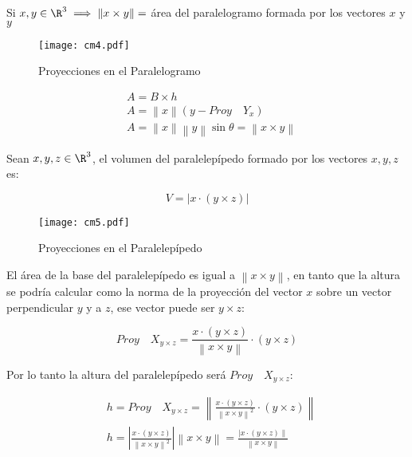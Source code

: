 Si $x,y\in \R^3\implies \left\lVert x\times y\right\rVert=$ área del paralelogramo formada por los vectores $x$ y $y$


\begin{figure}[h!]
	\centering
	\texttt{[image: cm4.pdf]}
	\caption{Proyecciones en el Paralelogramo}
\end{figure}

\begin{align*}
	 & A=B\times h                                                                                        \\
	 & A=\left\lVert x\right\rVert\left(y-Proy\quad Y_x\right)                                            \\
	 & A=\left\lVert x\right\rVert\left\lVert y\right\rVert\sin{\theta}=\left\lVert x\times y\right\rVert
\end{align*}


Sean $x,y,z\in \R^3$, el volumen del paralelepípedo formado por los vectores $x,y,z$ es:

\begin{equation}
	V=\left\lvert x\cdot(y\times z)\right\rvert
\end{equation}

\begin{figure}[h!]
	\centering
	\texttt{[image: cm5.pdf]}
	\caption{Proyecciones en el Paralelepípedo}
\end{figure}


El área de la base del paralelepípedo
es igual a $\left\lVert x\times y\right\rVert$,
en tanto que la altura se podría calcular como la
norma de la proyección del vector $x$ sobre un vector
perpendicular $y$ y a $z$, ese vector puede ser $y\times z$:

\begin{equation*}
	Proy\quad X_{y\times z}=\frac{x\cdot(y\times z)}{\left\lVert x\times y\right\rVert}\cdot (y\times z)
\end{equation*}

Por lo tanto la altura del paralelepípedo será $Proy\quad X_{y\times z}$:

\begin{align*}
	 & h=Proy\quad X_{y\times z}=\left\lVert \frac{x\cdot(y\times z)}{\left\lVert x\times y\right\rVert^2}\cdot (y\times z) \right\rVert                                                                               \\
	 & h=\left\lvert \frac{x\cdot (y\times z)}{\left\lVert x\times y\right\rVert^2}\right\rvert \left\lVert x\times y\right\rVert=\frac{\left\lvert x\cdot (y\times z)\right\rVert}{\left\lVert x\times y\right\rVert}
\end{align*}

